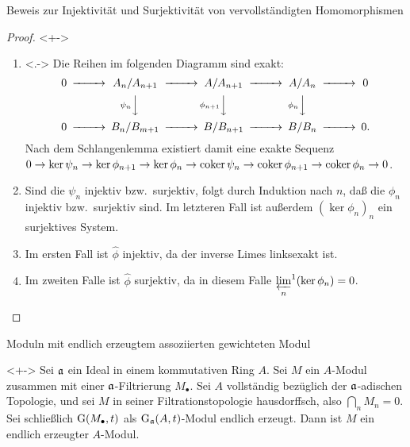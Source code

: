 \begin{frame}{Beweis zur Injektivität und Surjektivität von vervollständigten Homomorphismen}
	\begin{proof}<+->
		\begin{enumerate}[<+->]
		\item<.->
			Die Reihen im folgenden Diagramm sind exakt:
			\[
				\begin{CD}
					0 @>>> A_n/A_{n + 1} @>>> A/A_{n + 1} @>>> A/A_n @>>> 0 \\
					& & @V{\psi_n}VV @V{\phi_{n + 1}}VV @V{\phi_n}VV \\
					0 @>>> B_n/B_{m + 1} @>>> B/B_{n + 1} @>>> B/B_n @>>> 0.
				\end{CD}
			\]
			Nach dem Schlangenlemma existiert damit eine exakte Sequenz
			\(0 \to \ker \psi_n \to \ker \phi_{n + 1} \to \ker \phi_n \to \operatorname{coker} \psi_n \to \operatorname{coker} \phi_{n + 1} \to \operatorname{coker} \phi_n \to 0	
			\).
		\item
			Sind die \(\psi_n\) injektiv bzw.\ surjektiv, folgt durch Induktion nach \(n\), daß die \(\phi_n\) injektiv bzw.\ surjektiv
			sind. Im letzteren Fall ist außerdem \((\ker \phi_n)_n\) ein surjektives System.
		\item
			Im ersten Fall ist \(\hat \phi\) injektiv, da der inverse Limes linksexakt ist.
		\item
			Im zweiten Falle ist \(\hat \phi\) surjektiv, da in diesem Falle \({\varprojlim\limits_n}^1 (\ker \phi_n) = 0\).
			\qedhere
		\end{enumerate}
	\end{proof}
\end{frame}

\begin{frame}{Moduln mit endlich erzeugtem assoziierten gewichteten Modul}
	\begin{proposition}<+->
		\label{prop:weighted_mod_is_ft}
		Sei \(\mathfrak{a}\) ein Ideal in einem kommutativen Ring \(A\). Sei \(M\) ein \(A\)-Modul zusammen mit
		einer \(\mathfrak{a}\)-Filtrierung \(M_\bullet\). Sei \(A\) vollständig bezüglich der \(\mathfrak{a}\)-adischen Topologie,
		und sei \(M\) in seiner Filtrationstopologie hausdorffsch, also \(\bigcap\limits_n M_n = 0\). Sei schließlich
		\(\operatorname{G}(M_\bullet, t)\) als \(\operatorname{G}_{\mathfrak{a}}(A, t)\)-Modul endlich erzeugt. Dann ist \(M\) ein endlich
		erzeugter \(A\)-Modul.
	\end{proposition}
\end{frame}

